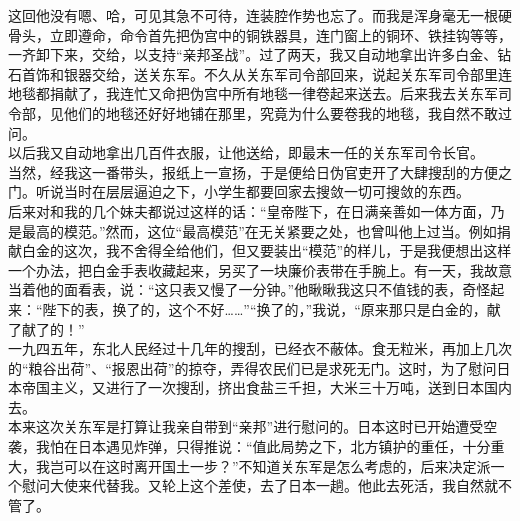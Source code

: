 这回他没有嗯、哈，可见其急不可待，连装腔作势也忘了。而我是浑身毫无一根硬骨头，立即遵命，命令首先把伪宫中的铜铁器具，连门窗上的铜环、铁挂钩等等，一齐卸下来，交给，以支持“亲邦圣战”。过了两天，我又自动地拿出许多白金、钻石首饰和银器交给，送关东军。不久从关东军司令部回来，说起关东军司令部里连地毯都捐献了，我连忙又命把伪宫中所有地毯一律卷起来送去。后来我去关东军司令部，见他们的地毯还好好地铺在那里，究竟为什么要卷我的地毯，我自然不敢过问。\\

以后我又自动地拿出几百件衣服，让他送给，即最末一任的关东军司令长官。\\

当然，经我这一番带头，报纸上一宣扬，于是便给日伪官吏开了大肆搜刮的方便之门。听说当时在层层逼迫之下，小学生都要回家去搜敛一切可搜敛的东西。\\

后来对和我的几个妹夫都说过这样的话：“皇帝陛下，在日满亲善如一体方面，乃是最高的模范。”然而，这位“最高模范”在无关紧要之处，也曾叫他上过当。例如捐献白金的这次，我不舍得全给他们，但又要装出“模范”的样儿，于是我便想出这样一个办法，把白金手表收藏起来，另买了一块廉价表带在手腕上。有一天，我故意当着他的面看表，说：“这只表又慢了一分钟。”他瞅瞅我这只不值钱的表，奇怪起来：“陛下的表，换了的，这个不好……”“换了的，”我说，“原来那只是白金的，献了献了的！”\\

一九四五年，东北人民经过十几年的搜刮，已经衣不蔽体。食无粒米，再加上几次的“粮谷出荷”、“报恩出荷”的掠夺，弄得农民们已是求死无门。这时，为了慰问日本帝国主义，又进行了一次搜刮，挤出食盐三千担，大米三十万吨，送到日本国内去。\\

本来这次关东军是打算让我亲自带到“亲邦”进行慰问的。日本这时已开始遭受空袭，我怕在日本遇见炸弹，只得推说：“值此局势之下，北方镇护的重任，十分重大，我岂可以在这时离开国土一步？”不知道关东军是怎么考虑的，后来决定派一个慰问大使来代替我。又轮上这个差使，去了日本一趟。他此去死活，我自然就不管了。
